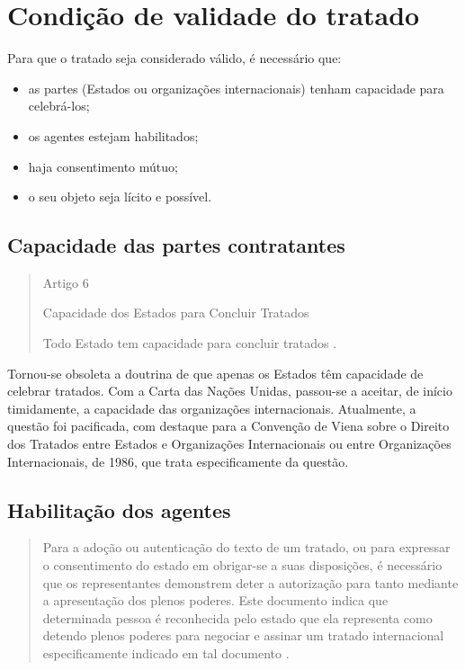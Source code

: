\documentclass{article}
\begin{document}
\section{Condição de validade do tratado}

Para que o tratado seja considerado válido, é necessário que:

\begin{itemize}
    \item as partes (Estados ou organizações internacionais) tenham capacidade para celebrá-los;
    \item os agentes estejam habilitados;
    \item haja consentimento mútuo;
    \item o seu objeto seja lícito e possível.
\end{itemize}

\subsection{Capacidade das partes contratantes}

\begin{quote}
    \begin{center}
         Artigo 6

        Capacidade dos Estados para Concluir Tratados
    \end{center}
Todo Estado tem capacidade para concluir tratados \cite{brasil_decreto_2009}.
    
\end{quote}

Tornou-se obsoleta a doutrina de que apenas os Estados têm capacidade de celebrar tratados. Com a Carta das Nações Unidas, passou-se a aceitar, de início timidamente, a capacidade das organizações internacionais. Atualmente, a questão foi pacificada, com destaque para a Convenção de Viena sobre o Direito dos Tratados entre Estados e Organizações Internacionais ou entre Organizações Internacionais, de 1986, que trata especificamente da questão.

\subsection{Habilitação dos agentes}

\begin{quote}
    Para a adoção ou autenticação do texto de um tratado, ou para expressar o consentimento do estado em obrigar-se a suas disposições, é necessário que os representantes demonstrem deter a autorização para tanto mediante a apresentação dos plenos poderes. Este documento indica que determinada pessoa é reconhecida pelo estado que ela representa como detendo plenos poderes para negociar e assinar um tratado internacional especificamente indicado em tal documento \cite[p.~155]{accioly_manual_2023}.
\end{quote}
\end{document}
